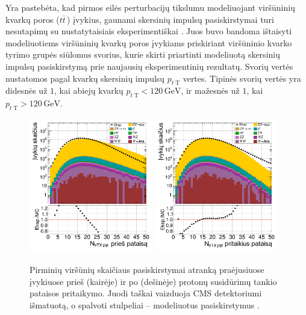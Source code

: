 \documentclass[a4paper, 12pt, oneside]{article}
\newcommand{\ttbar}{t\bar{t}}
\begin{document}
Yra pastebėta, kad pirmos eilės perturbacijų tikslumu modeliuojant viršūninių kvarkų poros ($\ttbar\,$)
įvykius, gaunami skersinių impulsų pasiskirstymai turi nesutapimų su nustatytaisiais eksperimentiškai \cite{ttbarPT}.
Juos buvo bandoma ištaisyti modeliuotiems viršūninių kvarkų poros įvykiams priskiriant viršūninio kvarko tyrimo grupės
siūlomus svorius, kurie skirti priartinti modeliuotą skersinių impulsų pasiskirstymą prie naujausių eksperimentinių rezultatų.
Svorių vertės nustatomos pagal kvarkų skersinių impulsų $p_{t \; \mathrm{T}}$ vertes.
Tipinės svorių vertės yra didesnės už $1$, kai abiejų kvarkų $p_{t \; \mathrm{T}}<120 \, \mathrm{GeV}$, ir mažesnės už $1$,
kai $p_{t \; \mathrm{T}}>120 \, \mathrm{GeV}$.

\begin{figure}[b!]
	\RawFloats
	\includegraphics[width=0.48\textwidth]{Kursinis3/mumu_nVTX_before.png}
	\includegraphics[width=0.48\textwidth]{Kursinis3/mumu_nVTX_after.png}
	\vspace{-0.5cm}
	\caption{\label{fig:PUba} Pirminių viršūnių skaičiaus pasiskirstymai atranką praėjusiuose įvykiuose prieš (kairėje)
		ir po (dešinėje) protonų susidūrimų tankio pataisos pritaikymo.
		Juodi taškai vaizduoja CMS detektoriumi išmatuotą, o spalvoti stulpeliai -- modeliuotus pasiskirstymus \cite{MAk2}.}

\end{figure}
\end{document}

